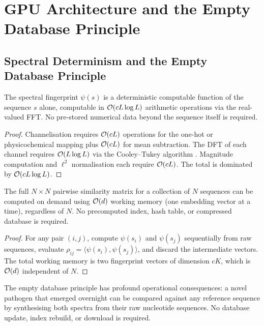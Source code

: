 \section{GPU Architecture and the Empty Database Principle}
\label{ps:sec:gpu}

\subsection{Spectral Determinism and the Empty Database Principle}

\begin{proposition}
\label{ps:prop:determinism}
The spectral fingerprint $\psi(s)$ is a deterministic computable function of
the sequence $s$ alone, computable in $\mathcal{O}(c L \log L)$ arithmetic operations
via the real-valued FFT. No pre-stored numerical data beyond the sequence itself
is required.
\end{proposition}

\begin{proof}
Channelisation requires $\mathcal{O}(cL)$ operations for the one-hot or
physicochemical mapping plus $\mathcal{O}(cL)$ for mean subtraction. The DFT of each
channel requires $\mathcal{O}(L \log L)$ via the Cooley--Tukey algorithm
\citep{oppenheim2009}. Magnitude computation and $\ell^2$ normalisation each
require $\mathcal{O}(cL)$. The total is dominated by $\mathcal{O}(cL\log L)$.
\end{proof}

\begin{corollary}
\label{ps:cor:empty_db}
The full $N \times N$ pairwise similarity matrix for a collection of $N$
sequences can be computed on demand using $\mathcal{O}(d)$ working memory (one
embedding vector at a time), regardless of $N$. No precomputed index, hash
table, or compressed database is required.
\end{corollary}

\begin{proof}
For any pair $(i, j)$, compute $\psi(s_i)$ and $\psi(s_j)$ sequentially from
raw sequences, evaluate $\rho_{ij} = \langle \psi(s_i), \psi(s_j) \rangle$,
and discard the intermediate vectors. The total working memory is two fingerprint
vectors of dimension $cK$, which is $\mathcal{O}(d)$ independent of $N$.
\end{proof}

The empty database principle has profound operational consequences: a novel
pathogen that emerged overnight can be compared against any reference sequence
by synthesising both spectra from their raw nucleotide sequences. No database
update, index rebuild, or download is required.

